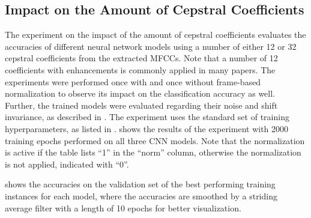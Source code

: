 
\subsection{Impact on the Amount of Cepstral Coefficients}
The experiment on the impact of the amount of cepstral coefficients evaluates the accuracies of different neural network models using a number of either 12 or 32 cepstral coefficients from the extracted MFCCs.
Note that a number of 12 coefficients with enhancements is commonly applied in many papers.
The experiments were performed once with and once without frame-based normalization to observe its impact on the classification accuracy as well.
Further, the trained models were evaluated regarding their noise and shift invariance, as described in .
The experiment uses the standard set of training hyperparameters, as listed in .
 shows the results of the experiment with 2000 training epochs performed on all three CNN models.
Note that the normalization is active if the table lists \enquote{1} in the \enquote{norm} column, otherwise the normalization is not applied, indicated with \enquote{0}.

 shows the accuracies on the validation set of the best performing training instances for each model, where the accuracies are smoothed by a striding average filter with a length of 10 epochs for better visualization.
